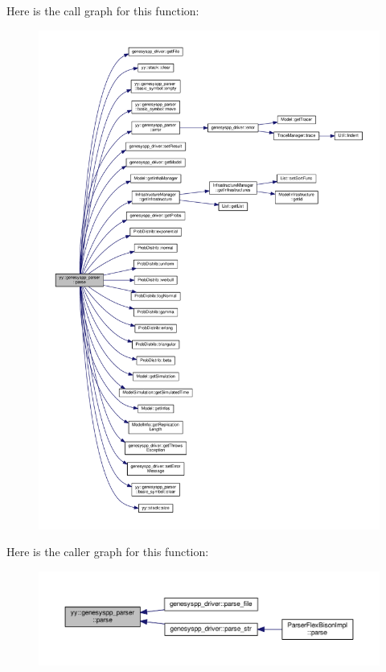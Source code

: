 Here is the call graph for this function\-:
\nopagebreak
\begin{figure}[H]
\begin{center}
\leavevmode
\includegraphics[width=350pt]{classyy_1_1genesyspp__parser_ab2fad51435ec4f28dfee2d5e4611f309_cgraph}
\end{center}
\end{figure}




Here is the caller graph for this function\-:\nopagebreak
\begin{figure}[H]
\begin{center}
\leavevmode
\includegraphics[width=350pt]{classyy_1_1genesyspp__parser_ab2fad51435ec4f28dfee2d5e4611f309_icgraph}
\end{center}
\end{figure}


